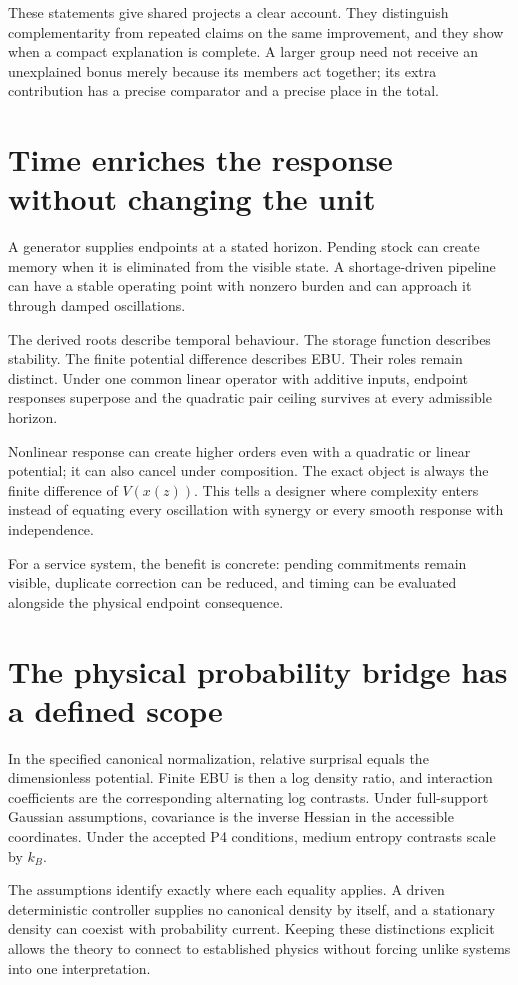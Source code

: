 These statements give shared projects a clear account. They distinguish complementarity from repeated claims on the same improvement, and they show when a compact explanation is complete. A larger group need not receive an unexplained bonus merely because its members act together; its extra contribution has a precise comparator and a precise place in the total.

\section{Time enriches the response without changing the unit}
A generator supplies endpoints at a stated horizon. Pending stock can create memory when it is eliminated from the visible state. A shortage-driven pipeline can have a stable operating point with nonzero burden and can approach it through damped oscillations.

The derived roots describe temporal behaviour. The storage function describes stability. The finite potential difference describes EBU. Their roles remain distinct. Under one common linear operator with additive inputs, endpoint responses superpose and the quadratic pair ceiling survives at every admissible horizon.

Nonlinear response can create higher orders even with a quadratic or linear potential; it can also cancel under composition. The exact object is always the finite difference of $V(x(z))$. This tells a designer where complexity enters instead of equating every oscillation with synergy or every smooth response with independence.

For a service system, the benefit is concrete: pending commitments remain visible, duplicate correction can be reduced, and timing can be evaluated alongside the physical endpoint consequence.

\section{The physical probability bridge has a defined scope}
In the specified canonical normalization, relative surprisal equals the dimensionless potential. Finite EBU is then a log density ratio, and interaction coefficients are the corresponding alternating log contrasts. Under full-support Gaussian assumptions, covariance is the inverse Hessian in the accessible coordinates. Under the accepted P4 conditions, medium entropy contrasts scale by $k_B$.

The assumptions identify exactly where each equality applies. A driven deterministic controller supplies no canonical density by itself, and a stationary density can coexist with probability current. Keeping these distinctions explicit allows the theory to connect to established physics without forcing unlike systems into one interpretation.

